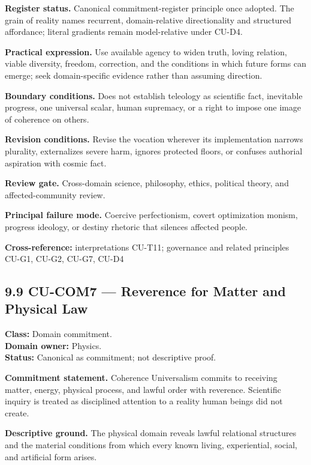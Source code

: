 \documentclass[
  11pt,
]{article}
\begin{document}
\textbf{Register status.} Canonical commitment-register principle once
adopted. The grain of reality names recurrent, domain-relative
directionality and structured affordance; literal gradients remain
model-relative under CU-D4.

\textbf{Practical expression.} Use available agency to widen truth,
loving relation, viable diversity, freedom, correction, and the
conditions in which future forms can emerge; seek domain-specific
evidence rather than assuming direction.

\textbf{Boundary conditions.} Does not establish teleology as scientific
fact, inevitable progress, one universal scalar, human supremacy, or a
right to impose one image of coherence on others.

\textbf{Revision conditions.} Revise the vocation wherever its
implementation narrows plurality, externalizes severe harm, ignores
protected floors, or confuses authorial aspiration with cosmic fact.

\textbf{Review gate.} Cross-domain science, philosophy, ethics,
political theory, and affected-community review.

\textbf{Principal failure mode.} Coercive perfectionism, covert
optimization monism, progress ideology, or destiny rhetoric that
silences affected people.

\textbf{Cross-reference:} interpretations CU-T11; governance and related
principles CU-G1, CU-G2, CU-G7, CU-D4

\subsection{9.9 CU-COM7 --- Reverence for Matter and Physical
Law}\label{cu-com7-reverence-for-matter-and-physical-law}

\textbf{Class:} Domain commitment.\\
\textbf{Domain owner:} Physics.\\
\textbf{Status:} Canonical as commitment; not descriptive proof.

\textbf{Commitment statement.} Coherence Universalism commits to
receiving matter, energy, physical process, and lawful order with
reverence. Scientific inquiry is treated as disciplined attention to a
reality human beings did not create.

\textbf{Descriptive ground.} The physical domain reveals lawful
relational structures and the material conditions from which every known
living, experiential, social, and artificial form arises.
\end{document}
